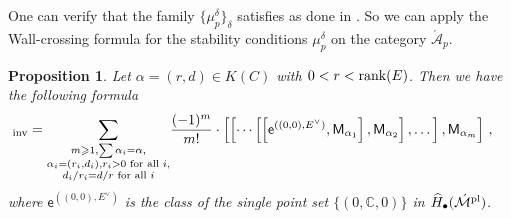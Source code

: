 \documentclass[11pt]{amsart}
\newtheorem{proposition}[theorem]{Proposition}
\theoremstyle{remark}
\newcommand{\C}{\mathbb{C}}
\newcommand{\Adash}{\acute{\mathcal{A}}}
\newcommand{\Mdash}{\acute{\mathcal{M}}}
\newcommand{\rk}{\textnormal{rank}}
\newcommand{\wh}[1]{\widehat{#1}}
\newcommand{\inv}[0]{\textnormal{inv}}
\newcommand{\pl}[0]{\textnormal{pl}}
\newcommand{\sfM}{\mathsf M}
\numberwithin{theorem}{section}
\begin{document}
One can verify that the family $\{\mu_p^\delta\}_\delta$ satisfies 
\cite[Assumptions 5.1-5.3]{Joy21} as done in \cite[Section 13]{JS12}. 
So we can apply the Wall-crossing formula \cite[Theorem 5.9]{Joy21} for the stability conditions $\mu_p^\delta$ on the category $\Adash_p$.
\begin{proposition}\label{proposition wall-crossing of pairs}
    Let $\alpha=(r,d) \in K(C)$ with $0<r<\rk(E)$.
    Then we have the following formula
    \begin{align*}
    [P(E,\alpha)]_\inv =
     \sum_{\substack{m \geqslant 1, \sum \alpha_i = \alpha, \\ 
                \alpha_i=(r_i,d_i), r_i>0 \text{ for all }i,\\
                d_i/r_i=d/r \text{ for all }i}}
                & \frac{(-1)^{m}}{m!} \cdot
    \left[ \left[ \cdots \left[ \left[\mathsf e^{((0,0),E^\vee)},\sfM_{\alpha_1} \right], \sfM_{\alpha_2} \right],\dots \right],\sfM_{\alpha_m}\right]\, ,
    \end{align*}
    where $\mathsf e^{((0,0),E^\vee)}$ is the class of the single point set $\{(0,\C,0)\}$ in $\wh H_{\bullet}(\Mdash^{\pl})$.
    \end{proposition}
\end{document}
